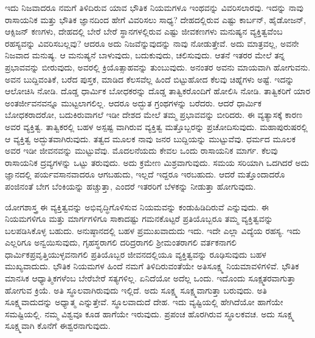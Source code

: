 ಇದು ನಿಜವಾದರೂ ನಮಗೆ ತಿಳಿದಿರುವ ಯಾವ ಭೌತಿಕ ನಿಯಮಗಳೂ ಇಂಥವನ್ನು ವಿವರಿಸಲಾರವು. ಇದನ್ನು ನಾವು ರಾಸಾಯನಿಕ ಮತ್ತು ಭೌತಿಕ ಜ್ಞಾನದಿಂದ ಹೇಗೆ ವಿವರಿಸಲು ಸಾಧ್ಯ? ದೇಹದಲ್ಲಿರುವ ಎಷ್ಟು ಕಾರ್ಬನ್, ಹೈಡೋಜನ್, ಆಕ್ಸಿಜನ್ ಕಣಗಳು, ದೇಹದಲ್ಲಿ ಬೇರೆ ಬೇರೆ ಸ್ಥಾನಗಳಲ್ಲಿರುವ ಎಷ್ಟು ಜೀವಕಣಗಳು ಮನುಷ್ಯನ ವ್ಯಕ್ತಿತ್ವವೆಂಬ ರಹಸ್ಯವನ್ನು ವಿವರಿಸಬಲ್ಲವು? ಆದರೂ ಅದು ನಿಜವೆನ್ನುವುದನ್ನು ನಾವು ನೋಡುತ್ತೇವೆ. ಅದು ಮಾತ್ರವಲ್ಲ, ಅವನೇ ನಿಜವಾದ ಮನುಷ್ಯ. ಆ ಮನುಷ್ಯನೆ ಬಾಳುವುದು, ಬದುಕುವುದು, ಚಲಿಸುವುದು. ಆತನೆ ಇತರರ ಮೇಲೆ ತನ್ನ ಪ್ರಭಾವವನ್ನು ಬೀರುವುದು, ಅವರಲ್ಲಿ ಕ್ರಿಯೊತ್ಸಾಹವನ್ನು ತುಂಬುವುದು. ಅನಂತರ ಅವನು ಮಾಯವಾಗಿ ಹೋಗುವನು. ಅವನ ಬುದ್ದಿವಂತಿಕೆ, ಬರೆದ ಪುಸ್ತಕ, ಮಾಡಿದ ಕೆಲಸವೆಲ್ಲ ಹಿಂದೆ ಬಿಟ್ಟುಹೋದ ಕೆಲವು ಚಿಹ್ನೆಗಳು ಅಷ್ಟೆ. ಇದನ್ನು ಆಲೋಚಿಸಿ ನೋಡಿ. ದೊಡ್ಡ ಧಾರ್ಮಿಕ ಬೋಧಕರನ್ನು ದೊಡ್ಡ ತಾತ್ವಿಕರೊಂದಿಗೆ ಹೋಲಿಸಿ ನೋಡಿ. ತಾತ್ವಿಕರಿಗೆ ಯಾರ ಅಂತರ್ಜೀವನವನ್ನೂ ಮುಟ್ಟಲಾಗಲಿಲ್ಲ. ಆದರೂ ಅದ್ಭುತ ಗ್ರಂಥಗಳನ್ನು ಬರೆದರು. ಆದರೆ ಧಾರ್ಮಿಕ ಬೋಧಕರಾದರೋ, ಬದುಕಿರುವಾಗಲೆ ಇಡೀ ದೇಶದ ಮೇಲೆ ತಮ್ಮ ಪ್ರಭಾವವನ್ನು ಬೀರಿದರು. ಈ ವ್ಯತ್ಯಾಸಕ್ಕೆ ಕಾರಣ ಅವರ ವ್ಯಕ್ತಿತ್ವ. ತಾತ್ವಿಕರಲ್ಲಿ ಬಹಳ ಅಸ್ಪಷ್ಟ ವಾಗಿರುವ ವ್ಯಕ್ತಿತ್ವ ಮತ್ತೊಬ್ಬರನ್ನು ಪ್ರಚೋದಿಸುವುದು. ಮಹಾಪುರುಷರಲ್ಲಿ ಆ ವ್ಯಕ್ತಿತ್ವ ಅದ್ಭುತವಾಗಿರುವುದು. ತತ್ವದ ಮೂಲಕ ನಾವು ಜನರ ಬುದ್ದಿಯನ್ನು ಮುಟ್ಟುವೆವು. ಧರ್ಮದ ಮೂಲಕ ಅವರ ಇಡೀ ಜೀವನವನ್ನು ಮುಟ್ಟುವೆವು. ಮೊದಲನೆಯದು ಕೇವಲ ಒಂದು ರಾಸಾಯನಿಕ ಮಾರ್ಗ. ಕೆಲವು ರಾಸಾಯನಿಕ ದ್ರವ್ಯಗಳನ್ನು ಒಟ್ಟು ತರುವುದು. ಅದು ಕ್ರಮೇಣ ಮಿಶ್ರವಾಗುವುದು. ಸಮಯ ಸರಿಯಾಗಿ ಒದಗಿದರೆ ಅದು ಜ್ಞಾನದಲ್ಲಿ ಪರ್ಯವಸಾನವಾದರೂ ಆಗಬಹುದು, ಇಲ್ಲದೆ ಇದ್ದರೂ ಇರಬಹುದು. ಆದರೆ ಮತ್ತೊಂದಾದರೊ ಪಂಜಿನಂತೆ ಬೇಗ ಬೆಂಕಿಯನ್ನು ಹಚ್ಚುತ್ತಾ, ಎಂದರೆ ಇತರರಿಗೆ ಬೆಳಕನ್ನು ನೀಡುತ್ತಾ ಹೋಗುವುದು.

ಯೋಗಶಾಸ್ತ್ರ ಈ ವ್ಯಕ್ತಿತ್ವವನ್ನು ಅಭಿವೃದ್ಧಿಗೊಳಿಸುವ ನಿಯಮವನ್ನು ಕಂಡುಹಿಡಿದಿರುವೆ ಎನ್ನುವುದು. ಈ ನಿಯಮಗಳಿಗೂ ಮತ್ತು ಮಾರ್ಗಗಳಿಗೂ ಸಾಕಾದಷ್ಟು ಗಮನಕೊಟ್ಟರೆ ಪ್ರತಿಯೊಬ್ಬರೂ ತಮ್ಮ ವ್ಯಕ್ತಿತ್ವವನ್ನು ಬಲಪಡಿಸಿಕೊಳ್ಳ ಬಹುದು. ಅನುಷ್ಠಾನದಲ್ಲಿ ಬಹಳ ಪ್ರಮುಖವಾದುದು ಇದು. ಇದೇ ಎಲ್ಲಾ ವಿದ್ಯೆಯ ರಹಸ್ಯ. ಇದು ಎಲ್ಲರಿಗೂ ಅನ್ವಯಿಸುವುದು, ಗೃಹಸ್ಥರಾಗಲಿ ದರಿದ್ರರಾಗಲಿ ಶ‍್ರೀಮಂತರಾಗಲಿ ವರ್ತಕನಾಗಲಿ ಧಾರ್ಮಿಕಪ್ರವೃತ್ತಿಯುಳ್ಳವನಾಗಲಿ ಪ್ರತಿಯೊಬ್ಬರ ಜೀವನದಲ್ಲಿಯೂ ವ್ಯಕ್ತಿತ್ವವನ್ನು ರೂಢಿಸುವುದು ಬಹಳ ಮುಖ್ಯವಾದುದು. ಭೌತಿಕ ನಿಯಮಗಳ ಹಿಂದೆ ನಮಗೆ ತಿಳಿದಿರುವಂತೆಯೇ ಅತಿಸೂಕ್ಷ್ಮ ನಿಯಮಾವಳಿಗಳಿವೆ. ಭೌತಿಕ ಮಾನಸಿಕ ಆಧ್ಯಾತ್ಮಿಕಗಳೆಂಬ ಬೇರೆಬೇರೆ ಸತ್ಯಗಳಿಲ್ಲ. ಏನಿದೆಯೋ ಅದೆಲ್ಲ ಒಂದು. ಇದೊಂದು ಸೂಕ್ಷ್ಮತರವಾಗುತ್ತಾ ಹೋಗುವ ಕ್ರಿಯೆ. ಅತಿ ಸ್ಥೂಲವಾಗಿರುವುದು ಇಲ್ಲಿದೆ. ಅದು ಸೂಕ್ಷ್ಮ ಸೂಕ್ಷ್ಮವಾಗುತ್ತಾ ಬರುವುದು. ಅತಿ ಸೂಕ್ಷ್ಮವಾದುದನ್ನು ಅಧ್ಯಾತ್ಮ ಎನ್ನುತ್ತೇವೆ. ಸ್ಥೂಲವಾದುದೆ ದೇಹ. ಇದು ವ್ಯಷ್ಟಿಯಲ್ಲಿ ಹೇಗಿದೆಯೋ ಹಾಗೆಯೇ ಸಮಷ್ಟಿಯಲ್ಲಿ. ನಮ್ಮ ವಿಶ್ವವೂ ಕೂಡ ಹಾಗೆಯೇ ಇರುವುದು. ಪ್ರಪಂಚ ಹೊರಗಿರುವ ಸ್ಥೂಲಕವಚ. ಅದು ಸೂಕ್ಷ್ಮ ಸೂಕ್ಷ್ಮವಾಗಿ ಕೊನೆಗೆ ಈಶ್ವರನಾಗುವುದು.

